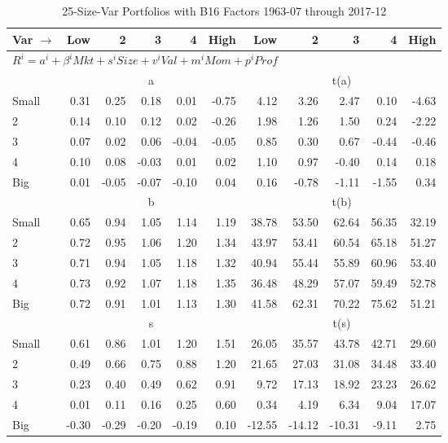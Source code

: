 
\begin{table}[H]
\footnotesize
\centering
\caption{25-Size-Var Portfolios with B16 Factors 1963-07 through 2017-12}
\begin{tabular}{lrrrrrrrrrr}
  \toprule
    
    Var $\rightarrow$ & Low & 2 & 3 & 4 & High & Low & 2 & 3 & 4 & High  \\ 
  \midrule
  \multicolumn{11}{l}{$R^i=a^i+\beta^iMkt+s^iSize+v^iVal+m^iMom+p^iProf$}  \\
  
     & \multicolumn{5}{c}{a} & \multicolumn{5}{c}{t(a)}   \\
     \cmidrule(r){2-6} \cmidrule(r){7-11} 
    Small  & 0.31  & 0.25  & 0.18  & 0.01  & -0.75  & 4.12  & 3.26  & 2.47  & 0.10  & -4.63   \\
    2  & 0.14  & 0.10  & 0.12  & 0.02  & -0.26  & 1.98  & 1.26  & 1.50  & 0.24  & -2.22   \\
    3  & 0.07  & 0.02  & 0.06  & -0.04  & -0.05  & 0.85  & 0.30  & 0.67  & -0.44  & -0.46   \\
    4  & 0.10  & 0.08  & -0.03  & 0.01  & 0.02  & 1.10  & 0.97  & -0.40  & 0.14  & 0.18   \\
    Big  & 0.01  & -0.05  & -0.07  & -0.10  & 0.04  & 0.16  & -0.78  & -1.11  & -1.55  & 0.34   \\
    
  
     & \multicolumn{5}{c}{b} & \multicolumn{5}{c}{t(b)}   \\
     \cmidrule(r){2-6} \cmidrule(r){7-11} 
    Small  & 0.65  & 0.94  & 1.05  & 1.14  & 1.19  & 38.78  & 53.50  & 62.64  & 56.35  & 32.19   \\
    2  & 0.72  & 0.95  & 1.06  & 1.20  & 1.34  & 43.97  & 53.41  & 60.54  & 65.18  & 51.27   \\
    3  & 0.71  & 0.94  & 1.05  & 1.18  & 1.32  & 40.94  & 55.44  & 55.89  & 60.96  & 53.40   \\
    4  & 0.73  & 0.92  & 1.07  & 1.18  & 1.35  & 36.48  & 48.29  & 57.07  & 59.49  & 52.78   \\
    Big  & 0.72  & 0.91  & 1.01  & 1.13  & 1.30  & 41.58  & 62.31  & 70.22  & 75.62  & 51.21   \\
    
  
     & \multicolumn{5}{c}{s} & \multicolumn{5}{c}{t(s)}   \\
     \cmidrule(r){2-6} \cmidrule(r){7-11} 
    Small  & 0.61  & 0.86  & 1.01  & 1.20  & 1.51  & 26.05  & 35.57  & 43.78  & 42.71  & 29.60   \\
    2  & 0.49  & 0.66  & 0.75  & 0.88  & 1.20  & 21.65  & 27.03  & 31.08  & 34.48  & 33.40   \\
    3  & 0.23  & 0.40  & 0.49  & 0.62  & 0.91  & 9.72  & 17.13  & 18.92  & 23.23  & 26.62   \\
    4  & 0.01  & 0.11  & 0.16  & 0.25  & 0.60  & 0.34  & 4.19  & 6.34  & 9.04  & 17.07   \\
    Big  & -0.30  & -0.29  & -0.20  & -0.19  & 0.10  & -12.55  & -14.12  & -10.31  & -9.11  & 2.75   \\
    

\end{tabular}
\end{table}
